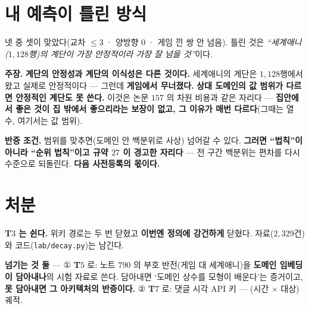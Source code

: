 \documentclass[10pt,a4paper]{article}
\newcommand{\claim}[2]{\begin{claimbox}\textbf{주장.} #1\par\smallskip
  \textcolor{gray!70}{\textbf{반증 조건.} #2}\end{claimbox}}
\begin{document}
\section{내 예측이 틀린 방식}

넷 중 셋이 맞았다(교차 $\leq 3$ · 양방향 $0$ · 게임 낀 쌍 안 넘음). 틀린 것은
\emph{``세계애니($1{,}128$행)의 계단이 가장 안정적이라 가장 잘 넘을 것''}이다.

\claim{\textbf{계단의 안정성과 계단의 이식성은 다른 것이다.} 세계애니의 계단은
$1{,}128$행에서 왔고 실제로 안정적이다 --- 그런데 \textbf{게임에서 무너졌다.}
\textbf{상대 도메인의 값 범위가 다르면 안정적인 계단도 못 쓴다.} 이것은 논문 $157$ 의
차원 비용과 같은 자리다 --- \textbf{집안에서 좋은 것이 집 밖에서 좋으리라는 보장이
없고, 그 이유가 매번 다르다}(그때는 열 수, 여기서는 값 범위).}
{범위를 맞추면(도메인 안 백분위로 사상) 넘어갈 수 있다. \textbf{그러면 ``법칙''이
아니라 ``순위 법칙''이고 규약 $27$ 이 경고한 자리다} --- 전 구간 백분위는 편차를
다시 수준으로 되돌린다. \textbf{다음 사전등록의 몫이다.}}

\section{처분}

\textbf{T$3$ 는 쉰다.} 위키 경로는 두 번 닫혔고 \textbf{이번엔 정의에 강건하게}
닫혔다. 자료($2{,}329$건)와 코드(\texttt{lab/decay.py})는 남긴다.

\begin{center}
\textbf{넘기는 것 둘} --- ① \textbf{T$5$} 로: 노트 $790$ 의 부호 반전(게임 대
세계애니)을 \textbf{도메인 임베딩이 담아내나}의 시험 자료로 쓴다. 담아내면
`도메인 상수를 모형이 배운다'는 증거이고, \textbf{못 담아내면 그 아키텍처의
반증이다.} ② \textbf{T$7$} 로: 댓글 시각 API 키 --- (시간 $\times$ 대상) 궤적.
\end{center}
\end{document}
